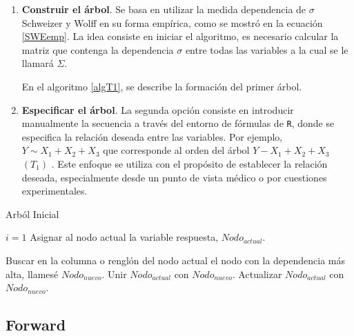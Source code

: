 \begin{enumerate}
    \item \textbf{Construir el árbol}. Se basa en utilizar la medida dependencia de $\sigma$ Schweizer y Wolff en su forma empírica, como se mostró en la ecuación \eqref{SWEemp}. La idea consiste en iniciar el algoritmo, es necesario calcular la matriz que contenga la dependencia $\sigma$ entre todas las variables a la cual se le llamará $\Sigma$.

    En el algoritmo \ref{algT1}, se describe la formación del primer árbol.

    \item \textbf{Especificar el árbol}. La segunda opción consiste en introducir manualmente la secuencia a través del entorno de fórmulas de \texttt{R}, donde se especifica la relación deseada entre las variables. Por ejemplo, $Y \sim X_1 + X_2 + X_3$ que corresponde al orden del árbol $Y - X_1 + X_2 + X_3$ $(T_1)$ . Este enfoque se utiliza con el propósito de establecer la relación deseada, especialmente desde un punto de vista médico o  por cuestiones experimentales.
\end{enumerate}

\begin{algorithm}[H]
      \caption{Arból Inicial}
      \label{algT1}
      \begin{algorithmic}[1]  
        
        \State $i = 1$
        \State Asignar al nodo actual la variable respuesta, $Nodo_{actual}$.
        
          \State Buscar en la columna o renglón del nodo actual el nodo con la dependencia más alta, llamesé $Nodo_{nuevo}$.
          \State Unir $Nodo_{actual}$ con $Nodo_{nuevo}$.
          \State Actualizar $Nodo_{actual}$ con $Nodo_{nuevo}$.     
        \EndWhile
       
      \end{algorithmic}
    \end{algorithm}


\subsection{Forward}

